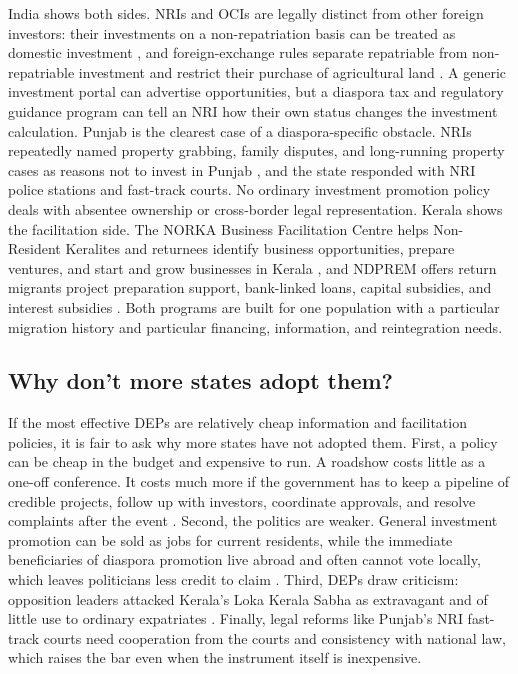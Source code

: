 \documentclass[12pt]{article}
\begin{document}
India shows both sides. NRIs and OCIs are legally distinct from other foreign investors: their investments on a non-repatriation basis can be treated as domestic investment \citep{unctad_india_nodate}, and foreign-exchange rules separate repatriable from non-repatriable investment and restrict their purchase of agricultural land \citep{reserve_bank_of_india_reserve_nodate}. A generic investment portal can advertise opportunities, but a diaspora tax and regulatory guidance program can tell an NRI how their own status changes the investment calculation. Punjab is the clearest case of a diaspora-specific obstacle. NRIs repeatedly named property grabbing, family disputes, and long-running property cases as reasons not to invest in Punjab \citep{pti_punjabi_2022}, and the state responded with NRI police stations and fast-track courts. No ordinary investment promotion policy deals with absentee ownership or cross-border legal representation. Kerala shows the facilitation side. The NORKA Business Facilitation Centre helps Non-Resident Keralites and returnees identify business opportunities, prepare ventures, and start and grow businesses in Kerala \citep{norka_nbfc_nodate}, and NDPREM offers return migrants project preparation support, bank-linked loans, capital subsidies, and interest subsidies \citep{norka_ndprem_nodate}. Both programs are built for one population with a particular migration history and particular financing, information, and reintegration needs.

\subsection{Why don't more states adopt them?}

If the most effective DEPs are relatively cheap information and facilitation policies, it is fair to ask why more states have not adopted them. First, a policy can be cheap in the budget and expensive to run. A roadshow costs little as a one-off conference. It costs much more if the government has to keep a pipeline of credible projects, follow up with investors, coordinate approvals, and resolve complaints after the event \citep{newland_developing_2012}. Second, the politics are weaker. General investment promotion can be sold as jobs for current residents, while the immediate beneficiaries of diaspora promotion live abroad and often cannot vote locally, which leaves politicians less credit to claim \citep{jensen_pass_2014}. Third, DEPs draw criticism: opposition leaders attacked Kerala's Loka Kerala Sabha as extravagant and of little use to ordinary expatriates \citep{tnn_cut_2022}. Finally, legal reforms like Punjab's NRI fast-track courts need cooperation from the courts and consistency with national law, which raises the bar even when the instrument itself is inexpensive.
\end{document}
